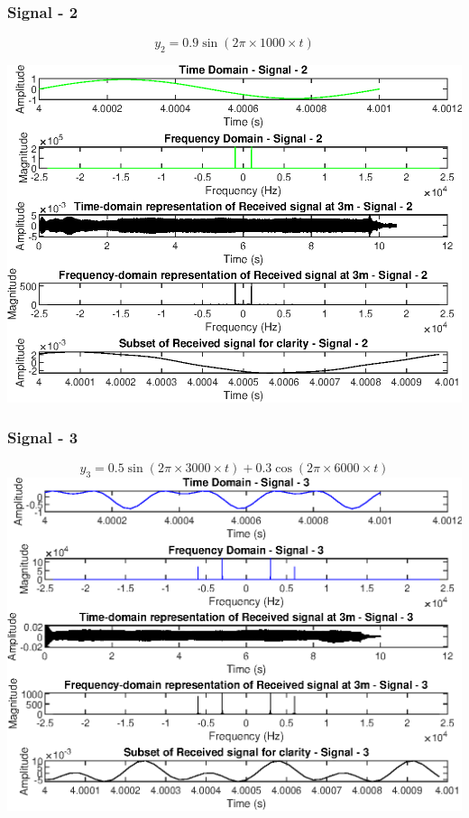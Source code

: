\documentclass{report}
\begin{document}
\newpage
\subsubsection{Signal - 2}

$$ y_2 = 0.9 \sin(2\pi \times 1000 \times t) $$

\includegraphics[width=1.1\linewidth]{3_2.eps}


\newpage
\subsubsection{Signal - 3}

$$ y_3 = 0.5 \sin(2\pi \times 3000 \times t) + 0.3 \cos(2\pi \times 6000 \times t) $$
\includegraphics[width=1.1\linewidth]{3_3.eps}
\end{document}
